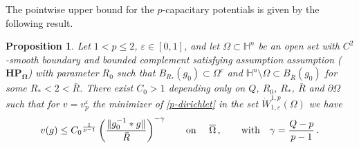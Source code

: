\documentclass[10pt]{amsart}
\numberwithin{equation}{section}
\newtheorem{proposition}[theorem]{Proposition}
\theoremstyle{definition}
\newcommand{\He}{\mathbb{H}}
\begin{document}
The pointwise upper bound for the $p$-capacitary potentials is given by the following result.
\begin{proposition}
\label{univ-pt-ubound-infinity}
 Let  $1<p\leq 2$, $\varepsilon \in [0,1]$, and let $\Omega \subset \He^n$ be an open set with $C^2$-smooth boundary and bounded complement satisfying assumption assumption ($\mathbf{HP_\Omega}$) with parameter $R_0$ such that $B_{R_\ast}(g_0) \subset \Omega^c$  and $\He^n \setminus \Omega \subset B_{\bar{R}}(g_0)$ for some $R_\ast<2 <\bar{R}$.  There exist  $C_0>1$ depending only on $Q$, $R_0$, $R_\ast$, $\bar{R}$ and $\partial \Omega$ such that  for $v=v^\varepsilon_p$ the minimizer of \eqref{p-dirichlet} in the set $\dot{W}^{1,p}_{1, \varepsilon} (\Omega)$ we have 
 \begin{equation}
 \label{pt-ubound-infinity}
 v(g) \leq {C_0}^{\frac1{p-1}}     \left( \frac{\| g_0^{-1}*g\|}{\bar{R}} \right)^{-\gamma} \qquad \hbox{on } \quad \overline{\Omega} \, , \qquad \hbox{with} \quad \gamma=\frac{Q-p}{p-1} \,  .
 \end{equation}
\end{proposition}
\end{document}
